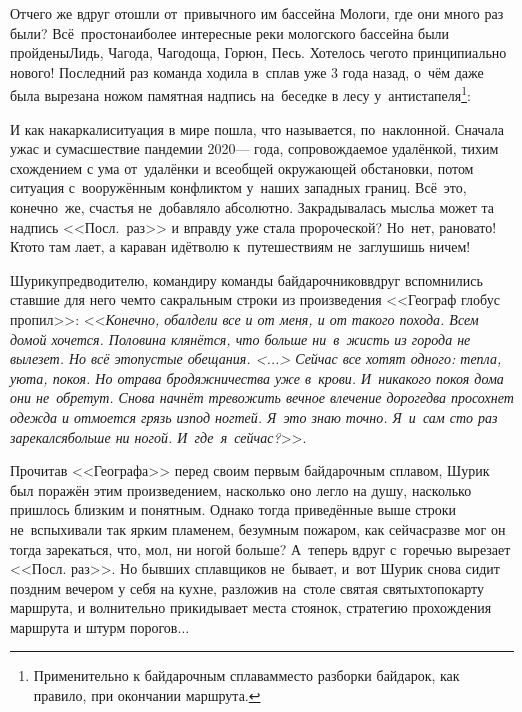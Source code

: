 {{\renewcommand*{\thefootnote}{\fnsymbol{footnote}}
\setcounter{footnote}{0}
Отчего же вдруг отошли от~привычного им бассейна Мологи, где они много раз были? Всё~просто\mdash наиболее интересные реки мологского бассейна были пройдены\mdash Лидь, Чагода, Чагодоща, Горюн, Песь. Хотелось чего\sdash то принципиально нового! Последний раз команда ходила в~сплав уже 3 года назад, о~чём даже была вырезана ножом памятная надпись на~беседке в лесу у~антистапеля\footnote{Применительно к байдарочным сплавам\mdash место разборки байдарок, как правило, при окончании маршрута.}: %

{\centering\Huge{}}

\newpage
И как накаркали\mdash ситуация в мире пошла, что называется, по~наклонной. Сначала ужас и сумасшествие пандемии 2020\thinspace\nobreakdash--- года, сопровождаемое удалёнкой, тихим схождением с ума от~удалёнки и всеобщей окружающей обстановки, потом ситуация с~вооружённым конфликтом у~наших западных границ. Всё~это, конечно~же, счастья не~добавляло абсолютно. Закрадывалась мысль\mdash а может та надпись <<Посл.~раз>> и вправду уже стала пророческой? Но~нет, рановато! Кто\sdash то там лает, а караван идёт\mdash волю к~путешествиям не~заглушишь ничем!

Шурику\mdash предводителю, командиру команды байдарочников\mdash вдруг вспомнились ставшие для него чем\sdash то сакральным строки из произведения <<Географ глобус пропил>>: <<\textit{Конечно, обалдели все и от меня, и от такого похода. Всем домой хочется. Половина клянётся, что больше ни~в~жисть из города не вылезет. Но всё это\mdash пустые обещания. <...> Сейчас все хотят одного: тепла, уюта, покоя. Но отрава бродяжничества уже в~крови. И~никакого покоя дома они не~обретут. Снова начнёт тревожить вечное влечение дорог\mdash едва просохнет одежда и отмоется грязь из\sdash под ногтей. Я~это знаю точно. Я~и~сам сто раз зарекался\mdash больше ни ногой. И~где~я~сейчас?}>>\cite{ГеографГлобусПропил}.

Прочитав <<Географа>> перед своим первым байдарочным сплавом, Шурик был поражён этим произведением, насколько оно легло на душу, насколько пришлось близким и понятным. Однако тогда приведённые выше строки не~вспыхивали так ярким пламенем, безумным пожаром, как сейчас\mdash разве мог он тогда зарекаться, что, мол, ни ногой больше? А~теперь вдруг с~горечью вырезает <<Посл. раз>>. Но бывших сплавщиков не~бывает, и~вот Шурик снова сидит поздним вечером у себя на кухне, разложив на~столе святая святых\mdash топокарту маршрута, и волнительно прикидывает места стоянок, стратегию прохождения маршрута и штурм порогов$\ldots$ 

}}

